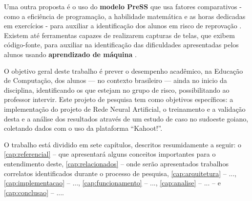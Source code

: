  Uma outra proposta é o uso do \textbf{modelo PreSS} que usa fatores comparativos - como a eficiência de programação, a habilidade matemática  e as horas dedicadas em exercícios - para auxiliar a identificação dos alunos em risco de reprovação \cite{quille2018}. Existem até ferramentas capazes de realizarem capturas de telas, que exibem código-fonte, para auxiliar na identificação das dificuldades apresentadas pelos alunos usando \textbf{aprendizado de máquina} \cite{ahadi2016early}.
 
O objetivo geral deste trabalho é prever o desempenho acadêmico, na Educação de Computação, dos alunos --- no contexto brasileiro --- ainda no inicio da disciplina, identificando os que estejam no grupo de risco, possibilitando ao professor intervir. Este projeto de pesquisa tem como objetivos específicos: a implementação do projeto de Rede Neural Artificial, o treinamento e a validação desta e a análise dos resultados através de um estudo de caso no sudoeste goiano, coletando dados com o uso da plataforma ``Kahoot!''.




O trabalho está dividido em sete capítulos, descritos resumidamente a seguir: o \autoref{cap:referencial} -- que apresentará alguns conceitos importantes para o entendimento deste, \autoref{cap:relacionados} -- onde serão apresentados trabalhos correlatos identificados durante o processo de pesquisa, \autoref{cap:arquitetura} -- ..., \autoref{cap:implementacao} -- ..., \autoref{cap:funcionamento} -- ..., \autoref{cap:analise} -- ... -- e \autoref{cap:conclusao} -- ....

